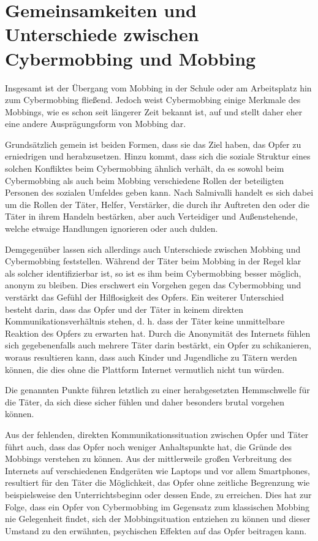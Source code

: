 \section{Gemeinsamkeiten und Unterschiede zwischen Cybermobbing und Mobbing}
Insgesamt ist der Übergang vom Mobbing in der Schule oder am Arbeitsplatz hin zum Cybermobbing fließend.
Jedoch weist Cybermobbing einige Merkmale des Mobbings, wie es schon seit längerer Zeit bekannt ist, auf und stellt daher eher eine andere Ausprägungsform von Mobbing dar.

Grundsätzlich gemein ist beiden Formen, dass sie das Ziel haben, das Opfer zu erniedrigen und herabzusetzen.
Hinzu kommt, dass sich die soziale Struktur eines solchen Konfliktes beim Cybermobbing ähnlich verhält, da es sowohl beim Cybermobbing als auch beim Mobbing verschiedene Rollen der beteiligten Personen des sozialen Umfeldes geben kann. \cite[S.\,453-459]{CS13}
Nach Salmivalli handelt es sich dabei um die Rollen der Täter, Helfer, Verstärker, die durch ihr Auftreten den oder die Täter in ihrem Handeln bestärken, aber auch Verteidiger und Außenstehende, welche etwaige Handlungen ignorieren oder auch dulden.

Demgegenüber lassen sich allerdings auch Unterschiede zwischen Mobbing und Cybermobbing feststellen.
Während der Täter beim Mobbing in der Regel klar als solcher identifizierbar ist, so ist es ihm beim Cybermobbing besser möglich, anonym zu bleiben. \cite{TK14}
Dies erschwert ein Vorgehen gegen das Cybermobbing und verstärkt das Gefühl der Hilflosigkeit des Opfers.
Ein weiterer Unterschied besteht darin, dass das Opfer und der Täter in keinem direkten Kommunikationsverhältnis stehen, d. h. dass der Täter keine unmittelbare Reaktion des Opfers zu erwarten hat.
Durch die Anonymität des Internets fühlen sich gegebenenfalls auch mehrere Täter darin bestärkt, ein Opfer zu schikanieren, woraus resultieren kann, dass auch Kinder und Jugendliche zu Tätern werden können, die dies ohne die Plattform Internet vermutlich nicht tun würden.

Die genannten Punkte führen letztlich zu einer herabgesetzten Hemmschwelle für die Täter, da sich diese sicher fühlen und daher besonders brutal vorgehen können.

Aus der fehlenden, direkten Kommunikationssituation zwischen Opfer und Täter führt auch, dass das Opfer noch weniger Anhaltspunkte hat, die Gründe des Mobbings verstehen zu können.
Aus der mittlerweile großen Verbreitung des Internets auf verschiedenen Endgeräten wie Laptops und vor allem Smartphones, resultiert für den Täter die Möglichkeit, das Opfer ohne zeitliche Begrenzung wie beispielsweise den Unterrichtsbeginn oder dessen Ende, zu erreichen.
Dies hat zur Folge, dass ein Opfer von Cybermobbing im Gegensatz zum klassischen Mobbing nie Gelegenheit findet, sich der Mobbingsituation entziehen zu können und dieser Umstand zu den erwähnten, psychischen Effekten auf das Opfer beitragen kann.

